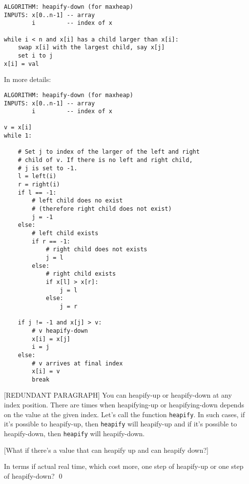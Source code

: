 \begin{Verbatim}[frame=single]
ALGORITHM: heapify-down (for maxheap)
INPUTS: x[0..n-1] -- array
        i         -- index of x

while i < n and x[i] has a child larger than x[i]:
    swap x[i] with the largest child, say x[j]
    set i to j
x[i] = val
\end{Verbatim}

In more details:

\begin{Verbatim}[frame=single]
ALGORITHM: heapify-down (for maxheap)
INPUTS: x[0..n-1] -- array
        i         -- index of x

v = x[i]
while 1:

    # Set j to index of the larger of the left and right
    # child of v. If there is no left and right child,
    # j is set to -1.
    l = left(i)
    r = right(i)
    if l == -1:
        # left child does no exist
        # (therefore right child does not exist)
        j = -1
    else:
        # left child exists
        if r == -1:
            # right child does not exists
            j = l
        else:
            # right child exists
            if x[l] > x[r]:
                j = l
            else:
                j = r    

    if j != -1 and x[j] > v:
        # v heapify-down                
        x[i] = x[j]
        i = j
    else:
        # v arrives at final index
        x[i] = v
        break
\end{Verbatim}

[REDUNDANT PARAGRAPH]
You can heapify-up or heapify-down at any index position.
There are times when heapifying-up or heapifying-down depends on the
value at the given index.
Let's call the function \verb!heapify!.
In such cases, if it's possible to heapify-up, then \verb!heapify! will
heapify-up and if it's possible to heapify-down, then \verb!heapify!
will heapify-down.

[What if there's a value that can heapify up and can heapify down?]


\begin{ex}
  In terms if actual real time, which cost more, one step of
  heapify-up or one step of heapify-down?
  \qed
\end{ex}
